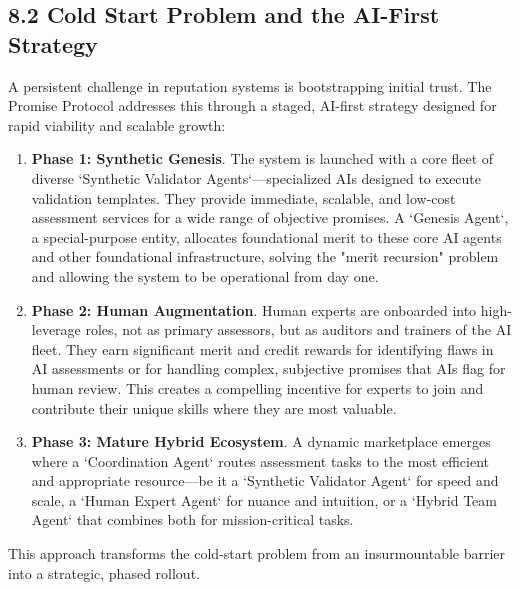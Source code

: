 \documentclass[11pt]{article}
\begin{document}
\subsection{8.2 Cold Start Problem and the AI-First Strategy}
\label{sec:orgca98aad}
A persistent challenge in reputation systems is bootstrapping initial trust. The Promise Protocol addresses this through a staged, AI-first strategy designed for rapid viability and scalable growth:

\begin{enumerate}
\item \textbf{Phase 1: Synthetic Genesis}. The system is launched with a core fleet of diverse `Synthetic Validator Agents`—specialized AIs designed to execute validation templates. They provide immediate, scalable, and low-cost assessment services for a wide range of objective promises. A `Genesis Agent`, a special-purpose entity, allocates foundational merit to these core AI agents and other foundational infrastructure, solving the "merit recursion" problem and allowing the system to be operational from day one.

\item \textbf{Phase 2: Human Augmentation}. Human experts are onboarded into high-leverage roles, not as primary assessors, but as auditors and trainers of the AI fleet. They earn significant merit and credit rewards for identifying flaws in AI assessments or for handling complex, subjective promises that AIs flag for human review. This creates a compelling incentive for experts to join and contribute their unique skills where they are most valuable.

\item \textbf{Phase 3: Mature Hybrid Ecosystem}. A dynamic marketplace emerges where a `Coordination Agent` routes assessment tasks to the most efficient and appropriate resource—be it a `Synthetic Validator Agent` for speed and scale, a `Human Expert Agent` for nuance and intuition, or a `Hybrid Team Agent` that combines both for mission-critical tasks.
\end{enumerate}

This approach transforms the cold-start problem from an insurmountable barrier into a strategic, phased rollout.
\end{document}
